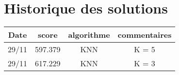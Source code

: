 \section*{Historique des solutions}

\begin{tabular}{|c|c|c|c|}
  \hline
  Date & score & algorithme & commentaires \\
  \hline
  29/11 & 597.379 & KNN & K = 5\\
  \hline
  29/11 & 617.229 & KNN & K = 3\\
\end{tabular}
